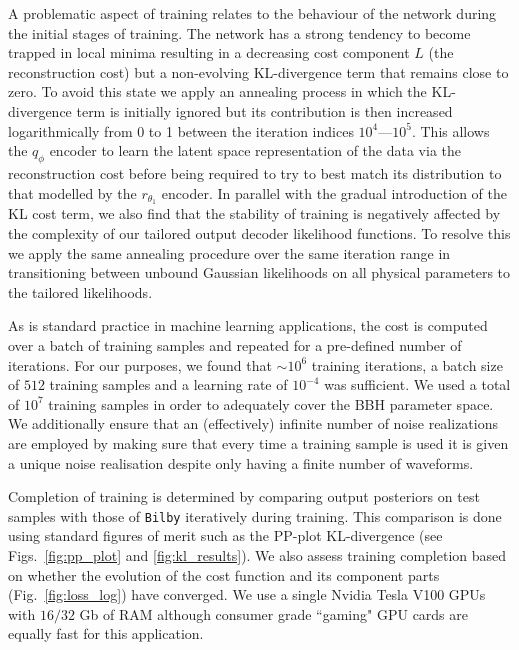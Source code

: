 \documentclass[%
showpacs,
nofootinbib,
 amsmath,amssymb,
 aps,
 twocolumn,
 prl,
 reprint,
floatfix,
]{revtex4-1}
\begin{document}
%
%
A problematic aspect of training relates to the behaviour of the network
during the initial stages of training. The network has a strong tendency to
become trapped in local minima resulting in a decreasing cost component $L$
(the reconstruction cost) but a non-evolving \ac{KL}-divergence term that
remains close to zero. To avoid this state we apply an annealing process in
which the \ac{KL}-divergence term is initially ignored but its contribution is
then increased logarithmically from 0 to 1 between the iteration indices
$10^4$---$10^5$. This allows the $q_{\phi}$ encoder to learn the latent space
representation of the data via the reconstruction cost before being required to
try to best match its distribution to that modelled by the $r_{\theta_1}$
encoder. In parallel with the gradual introduction of the \ac{KL} cost term, we
also find that the stability of training is negatively affected by the
complexity of our tailored output decoder likelihood functions. To resolve this
we apply the same annealing procedure over the same iteration range in transitioning
between unbound Gaussian likelihoods on all physical parameters to the tailored
likelihoods.   

%
%
As is standard practice in machine learning applications, the cost is computed
over a batch of training samples and repeated for a pre-defined number of
iterations. For our purposes, we found that $\sim 10^6$ training
iterations, a batch size of $512$ training samples and a learning rate of
$10^{-4}$ was sufficient. We used a total of $10^7$ training samples in order
to adequately cover the \ac{BBH} parameter space. We additionally ensure that
an (effectively) infinite number of noise realizations are employed by making
sure that every time a training sample is used it is given a unique noise
realisation despite only having a finite number of waveforms.

%
%
Completion of training is determined by comparing output posteriors on test
samples with those of \texttt{Bilby} iteratively during training. This
comparison is done using standard figures of merit such as the \ac{PP}-plot
\ac{KL}-divergence (see Figs.~\ref{fig:pp_plot} and
\ref{fig:kl_results}). We also assess training completion based on whether the
evolution of the cost function and its component parts
(Fig.~\ref{fig:loss_log}) have converged. We use a single Nvidia Tesla V100
\acp{GPU} with $16/32$ Gb of RAM although consumer grade ``gaming" \ac{GPU}
cards are equally fast for this application.
\end{document}
